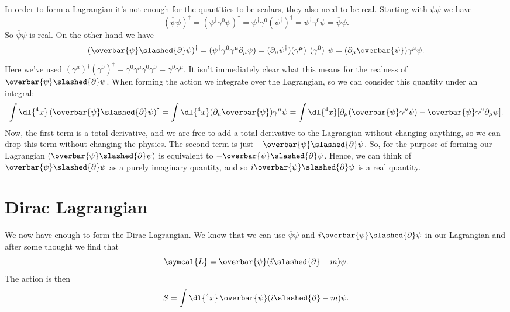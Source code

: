 \documentclass[fleqn]{NotesClass}
\newcommand{\lagrangianDensity}{\symcal{L}}
\newcommand{\hermit}{{\dagger}}
\newcommand{\diracadjoint}[1]{\overbar{#1}}
\begin{document}
    In order to form a Lagrangian it's not enough for the quantities to be scalars, they also need to be real.
    Starting with \(\diracadjoint{\psi}\psi\) we have
    \begin{equation}
        (\diracadjoint{\psi}\psi)^\hermit = (\psi^\hermit \gamma^0 \psi)^\hermit = \psi^\hermit \gamma^0 (\psi^\hermit)^\hermit = \psi^\hermit \gamma^0 \psi = \diracadjoint{\psi}\psi.
    \end{equation}
    So \(\diracadjoint{\psi}\psi\) is real.
    On the other hand we have
    \begin{equation}
        (\diracadjoint{\psi}\slashed{\partial}\psi)^\hermit = (\psi^\hermit \gamma^0 \gamma^\mu \partial_\mu \psi) = (\partial_\mu\psi^\hermit) (\gamma^\mu)^\hermit (\gamma^0)^\hermit \psi = (\partial_\mu \diracadjoint{\psi}) \gamma^\mu \psi.
    \end{equation}
    Here we've used \((\gamma^\mu)^\hermit (\gamma^0)^\hermit = \gamma^0\gamma^\mu\gamma^0 \gamma^0 = \gamma^0 \gamma^\mu\).
    It isn't immediately clear what this means for the realness of \(\diracadjoint{\psi}\slashed{\partial}\psi\).
    When forming the action we integrate over the Lagrangian, so we can consider this quantity under an integral:
    \begin{equation}
        \int \dl{^4x} \, (\diracadjoint{\psi} \slashed{\partial} \psi)^\hermit = \int \dl{^4x} (\partial_\mu \diracadjoint{\psi}) \gamma^\mu \psi = \int \dl{^4x} [\partial_\mu(\diracadjoint{\psi}\gamma^\mu \psi) - \diracadjoint{\psi}\gamma^\mu\partial_\mu\psi].
    \end{equation}
    Now, the first term is a total derivative, and we are free to add a total derivative to the Lagrangian without changing anything, so we can drop this term without changing the physics.
    The second term is just \(-\diracadjoint{\psi}\slashed{\partial}\psi\).
    So, for the purpose of forming our Lagrangian \((\diracadjoint{\psi}\slashed{\partial}\psi)\) is equivalent to \(-\diracadjoint{\psi}\slashed{\partial}\psi\).
    Hence, we can think of \(\diracadjoint{\psi}\slashed{\partial}\psi\) as a purely imaginary quantity, and so \(i\diracadjoint{\psi}\slashed{\partial}\psi\) is a real quantity.
    
    \section{Dirac Lagrangian}
    We now have enough to form the Dirac Lagrangian.
    We know that we can use \(\diracadjoint{\psi}\psi\) and \(i\diracadjoint{\psi}\slashed{\partial}\psi\) in our Lagrangian and after some thought we find that
    \begin{equation}
        \lagrangianDensity = \diracadjoint{\psi}(i\slashed{\partial} - m)\psi.
    \end{equation}
    The action is then
    \begin{equation}
        S = \int \dl{^4x} \, \diracadjoint{\psi}(i\slashed{\partial} - m)\psi.
    \end{equation}
    
\end{document}

